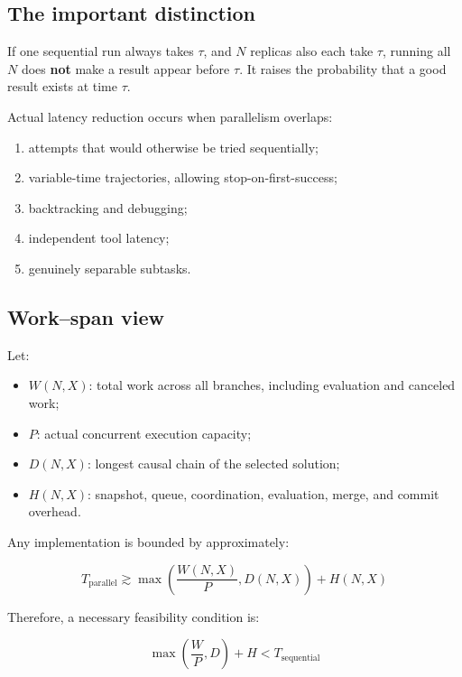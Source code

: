 \documentclass[
  letterpaper,
]{article}
\providecommand{\tightlist}{%
  \setlength{\itemsep}{0pt}\setlength{\parskip}{0pt}}
\begin{document}
\subsection{The important distinction}\label{the-important-distinction}

If one sequential run always takes \(\tau\), and \(N\) replicas also each take \(\tau\), running all \(N\) does \textbf{not} make a result appear before \(\tau\). It raises the probability that a good result exists at time \(\tau\).

Actual latency reduction occurs when parallelism overlaps:

\begin{enumerate}
\def\labelenumi{\arabic{enumi}.}
\tightlist
\item
  attempts that would otherwise be tried sequentially;
\item
  variable-time trajectories, allowing stop-on-first-success;
\item
  backtracking and debugging;
\item
  independent tool latency;
\item
  genuinely separable subtasks.
\end{enumerate}

\subsection{Work--span view}\label{workspan-view}

Let:

\begin{itemize}
\tightlist
\item
  \(W(N,X)\): total work across all branches, including evaluation and canceled work;
\item
  \(P\): actual concurrent execution capacity;
\item
  \(D(N,X)\): longest causal chain of the selected solution;
\item
  \(H(N,X)\): snapshot, queue, coordination, evaluation, merge, and commit overhead.
\end{itemize}

Any implementation is bounded by approximately:

\[
T_{\text{parallel}} \gtrsim
\max\left(\frac{W(N,X)}{P}, D(N,X)\right)+H(N,X)
\]

Therefore, a necessary feasibility condition is:

\[
\max\left(\frac{W}{P},D\right)+H<T_{\text{sequential}}
\]
\end{document}
